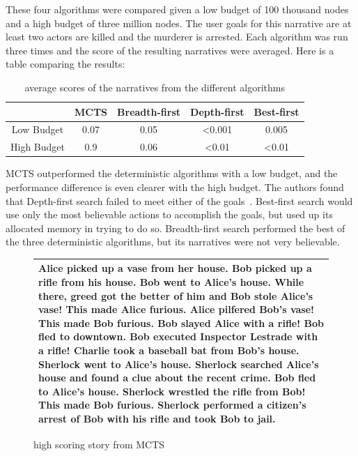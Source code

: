 \documentclass{sig-alternate}
\begin{document}
These four algorithms were compared given a low budget of 100 thousand nodes and a high budget of three million nodes. The user goals for this narrative are at least two actors are killed and the murderer is arrested. Each algorithm was run three times and the score of the resulting narratives were averaged. Here is a table comparing the results: 

\begin{table}[h]
	\begin{tabular}{ c | c | c | c | c |}
	\cline{2-5}	 
	 & MCTS & Breadth-first & Depth-first & Best-first \\ \hline
	\multicolumn{1}{|p{1.05cm}|}{Low Budget} & 0.07 & 0.05 & <0.001 & 0.005 \\ \hline
	\multicolumn{1}{|p{1.05cm}|}{High Budget} & 0.9 & 0.06 & <0.01 & <0.01 \\ \hline
	\end{tabular}
	\caption[Table caption text]{average scores of the narratives from the different algorithms}
\end{table}

MCTS outperformed the deterministic algorithms with a low budget, and the performance difference is even clearer with the high budget. The authors found that Depth-first search failed to meet either of the goals~\cite{Narrative}. Best-first search would use only the most believable actions to accomplish the goals, but used up its allocated memory in trying to do so. Breadth-first search performed the best of the three deterministic algorithms, but its narratives were not very believable.

\begin{figure}[h]
\begin{tabular}{|p{8cm}|}
\hline
Alice picked up a vase from her house. Bob picked up a rifle from his house. Bob went to Alice's house. While there, greed got the better of him and Bob stole Alice's vase! This made Alice furious. Alice pilfered Bob's vase! This made Bob furious. Bob slayed Alice with a rifle! Bob fled to downtown. Bob executed Inspector Lestrade with a rifle! Charlie took a baseball bat from Bob's house. Sherlock went to Alice's house. Sherlock searched Alice's house and found a clue about the recent crime. Bob fled to Alice's house. Sherlock wrestled the rifle from Bob! This made Bob furious. Sherlock performed a citizen's arrest of Bob with his rifle and took Bob to jail. \\ \hline
\end{tabular}
\centering
\caption{high scoring story from MCTS}
\label{fig:GoodStory}
\end{figure}
\end{document}
